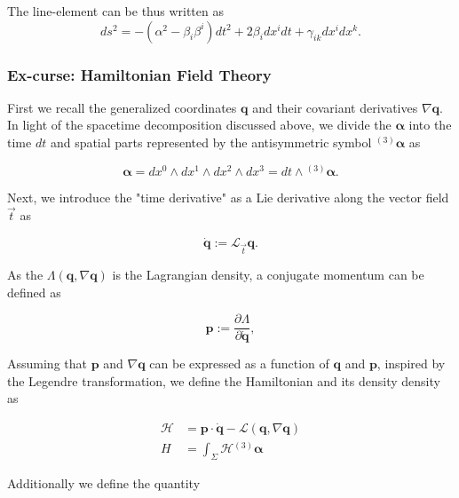 \documentclass[11pt,a4paper,headinclude=true,DIV=14,BCOR=8mm,chapterprefix,listof=totoc,twoside,openright,abstracton]{scrbook}
\begin{document}
The line-element can be thus written as
\begin{equation}
    ds^2 = -(\alpha^2-\beta_i\beta^i)dt^2 +2\beta_i dx^i dt + \gamma_{ik} dx^i dx^k.
\end{equation}

\subsubsection{Ex-curse: Hamiltonian Field Theory}

First we recall the generalized coordinates $\boldsymbol{q}$ and their covariant derivatives $\nabla\boldsymbol{q}$. \\
In light of the spacetime decomposition discussed above, we divide the $\boldsymbol{\alpha}$ into the time $dt$ and spatial parts represented by the antisymmetric symbol ${^{(3)}\boldsymbol{\alpha}}$ as 

\begin{equation}
    \boldsymbol{\alpha} = dx^0 \wedge dx^1 \wedge dx^2 \wedge dx^3 = dt \wedge {^{(3)}\boldsymbol{\alpha}}.
\end{equation}

Next, we introduce the "time derivative" as a Lie derivative along the vector field $\vec{t}$ as 

\begin{equation}
    \dot{\boldsymbol{q}} := \mathcal{L}_{\vec{t}}\boldsymbol{q}.
\end{equation}

As the $\Lambda(\boldsymbol{q}, \nabla\boldsymbol{q})$ is the Lagrangian density, a conjugate momentum can be defined as 

\begin{equation}
    \boldsymbol{p} := \frac{\partial\Lambda}{\partial\dot{\boldsymbol{q}}},
\end{equation}

Assuming that $\boldsymbol{p}$ and $\nabla\boldsymbol{q}$ can be expressed as a function of $\boldsymbol{q}$ and $\boldsymbol{p}$, inspired by the Legendre transformation, we define the Hamiltonian and its density density as

\begin{align}
    \mathcal{H} &= \boldsymbol{p}\cdot\dot{\boldsymbol{q}} - \mathcal{L}(\boldsymbol{q}, \nabla\boldsymbol{q}) \\
    H &= \int_{\Sigma}\mathcal{H}{^{(3)}\boldsymbol{\alpha}}
\end{align}

Additionally we define the quantity 
\end{document}
